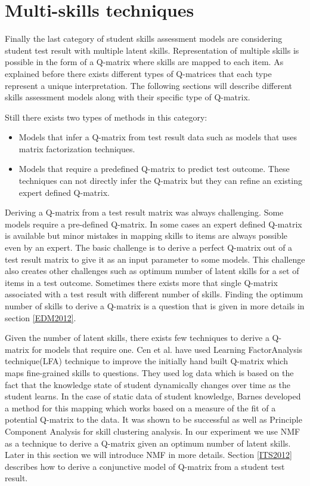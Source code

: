 \section{Multi-skills techniques}

Finally the last category of student skills assessment models are considering student test result with multiple latent skills. Representation of multiple skills is possible in the form of a Q-matrix where skills are mapped to each item. As explained before there exists different types of Q-matrices that each type represent a unique interpretation. The following sections will describe different skills assessment models along with their specific type of Q-matrix.


Still there exists two types of methods in this category: 
\begin{itemize}
\item Models that infer a Q-matrix from test result data such as models that uses matrix factorization techniques.
\item Models that require a predefined Q-matrix to predict test outcome. These techniques can not directly infer the Q-matrix but they can refine an existing expert defined Q-matrix.
\end{itemize}

Deriving a Q-matrix from a test result matrix was always challenging. Some models require a pre-defined Q-matrix. In some cases an expert defined Q-matrix is available but minor mistakes in mapping skills to items are always possible even by an expert. The basic challenge is to derive a perfect Q-matrix out of a test result matrix to give it as an input parameter to some models. This challenge also creates other challenges  such as optimum number of latent skills for a set of items in a test outcome. Sometimes there exists more that single Q-matrix associated with a test result with different number of skills. Finding the optimum number of skills to derive a Q-matrix is a question that is given in more details in section \ref{EDM2012}. 

Given the number of latent skills, there exists few techniques to derive a Q-matrix for models that require one. Cen et al. \citep{Cen2005,Cen2006} have used Learning FactorAnalysis technique(LFA) technique to improve the initially hand built Q-matrix which maps fine-grained skills to questions. They used log data which is based on the fact that the knowledge state of student dynamically changes over time as the student learns. In the case of static data of student knowledge, Barnes \citep{Barnes06} developed a method for this mapping which works based on a measure of the fit of a potential Q-matrix to the data. It was shown to be successful as well as Principle Component Analysis for skill clustering analysis. In our experiment we use NMF as a technique to derive a Q-matrix given an optimum number of latent skills. Later in this section we will introduce NMF in more details. Section \ref{ITS2012} describes how to derive a conjunctive model of Q-matrix from a student test result.

